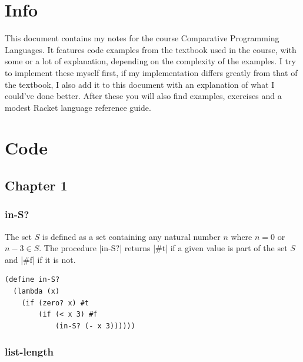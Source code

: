 \documentclass[a4paper]{article}
\begin{document}

\newcommand{\subsubsubsection}[1]{\paragraph{#1}\mbox{}\\}

\tableofcontents

\newpage

\section{Info}

This document contains my notes for the course Comparative Programming Languages. It features code examples from the textbook used in the course, with some or a lot of explanation, depending on the complexity of the examples. I try to implement these myself first, if my implementation differs greatly from that of the textbook, I also add it to this document with an explanation of what I could've done better. After these you will also find examples, exercises and a modest Racket language reference guide.

\newpage

\section{Code}

\subsection{Chapter 1}

\subsubsection{in-S?}

The set $S$ is defined as a set containing any natural number $n$ where $n = 0$ or $n - 3 \in S$. The procedure |in-S?| returns |#t| if a given value is part of the set $S$ and |#f| if it is not.

\begin{lstlisting}
(define in-S?
  (lambda (x)
    (if (zero? x) #t
        (if (< x 3) #f
            (in-S? (- x 3))))))
\end{lstlisting}

\subsubsection{list-length}
\end{document}
